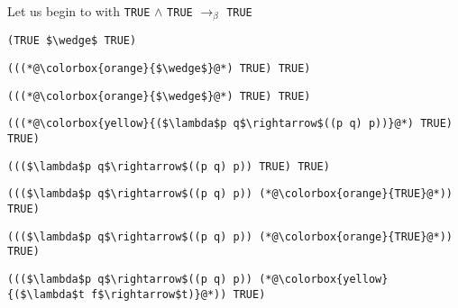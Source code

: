 \documentclass{beamer}
\begin{document}
\begin{frame}[fragile]{\CurrentSection}
\begin{block}{\CurrentSubSection}
Let us begin to with \texttt{TRUE} $\wedge$ \texttt{TRUE} $\rightarrow_\beta$ \texttt{TRUE}
\end{block}


\end{frame}

\begin{frame}[fragile]{\CurrentSection}
\lstset{basicstyle=\ttfamily\small}\lstset{numbers=none}\lstset{language=ML}\begin{lstlisting}
(TRUE $\wedge$ TRUE)
\end{lstlisting}
\pause\lstset{language=ML}\begin{lstlisting}
(((*@\colorbox{orange}{$\wedge$}@*) TRUE) TRUE)
\end{lstlisting}

\end{frame}

\begin{frame}[fragile]{\CurrentSection}
\lstset{basicstyle=\ttfamily\small}\lstset{numbers=none}\lstset{language=ML}\begin{lstlisting}
(((*@\colorbox{orange}{$\wedge$}@*) TRUE) TRUE)
\end{lstlisting}
\pause\lstset{language=ML}\begin{lstlisting}
(((*@\colorbox{yellow}{($\lambda$p q$\rightarrow$((p q) p))}@*) TRUE) TRUE)
\end{lstlisting}

\end{frame}

\begin{frame}[fragile]{\CurrentSection}
\lstset{basicstyle=\ttfamily\small}\lstset{numbers=none}\lstset{language=ML}\begin{lstlisting}
((($\lambda$p q$\rightarrow$((p q) p)) TRUE) TRUE)
\end{lstlisting}
\pause\lstset{language=ML}\begin{lstlisting}
((($\lambda$p q$\rightarrow$((p q) p)) (*@\colorbox{orange}{TRUE}@*)) TRUE)
\end{lstlisting}

\end{frame}

\begin{frame}[fragile]{\CurrentSection}
\lstset{basicstyle=\ttfamily\small}\lstset{numbers=none}\lstset{language=ML}\begin{lstlisting}
((($\lambda$p q$\rightarrow$((p q) p)) (*@\colorbox{orange}{TRUE}@*)) TRUE)
\end{lstlisting}
\pause\lstset{language=ML}\begin{lstlisting}
((($\lambda$p q$\rightarrow$((p q) p)) (*@\colorbox{yellow}{($\lambda$t f$\rightarrow$t)}@*)) TRUE)
\end{lstlisting}

\end{frame}
\end{document}

